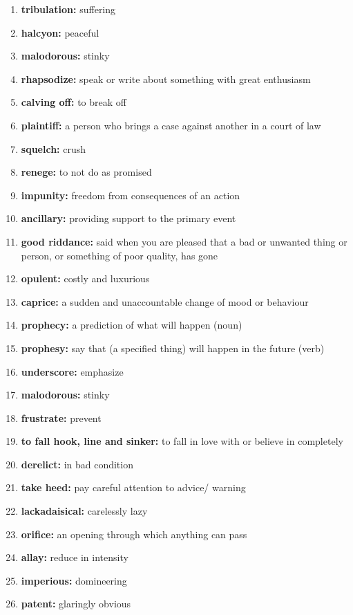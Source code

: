 \documentclass{article}
\begin{document}
\begin{enumerate}
    \item \textbf{tribulation: }{suffering}
    \item \textbf{halcyon: }{peaceful}
    \item \textbf{malodorous: }{stinky}
    \item \textbf{rhapsodize: }{speak or write about something with great enthusiasm}
    \item \textbf{calving off: }{to break off}
    \item \textbf{plaintiff: }{a person who brings a case against another in a court of law}
    \item \textbf{squelch: }{crush}
    \item \textbf{renege: }{to not do as promised}
    \item \textbf{impunity: }{freedom from consequences of an action}
    \item \textbf{ancillary: }{providing support to the primary event}
    \item \textbf{good riddance: }{said when you are pleased that a bad or unwanted thing or person, or something of poor quality, has gone}
    \item \textbf{opulent: }{costly and luxurious}
    \item \textbf{caprice: }{a sudden and unaccountable change of mood or behaviour}
    \item \textbf{prophecy: }{a prediction of what will happen (noun)}
    \item \textbf{prophesy: }{say that (a specified thing) will happen in the future (verb)}
    \item \textbf{underscore: }{emphasize}
    \item \textbf{malodorous: }{stinky}
    \item \textbf{frustrate: }{prevent}
    \item \textbf{to fall hook, line and sinker: }{to fall in love with or believe in completely}
    \item \textbf{derelict: }{in bad condition}
    \item \textbf{take heed: }{pay careful attention to advice/ warning}
    \item \textbf{lackadaisical: }{carelessly lazy}
    \item \textbf{orifice: }{an opening through which anything can pass}
    \item \textbf{allay: }{reduce in intensity}
    \item \textbf{imperious: }{domineering}
    \item \textbf{patent: }{glaringly obvious}

\end{enumerate}
\end{document}
